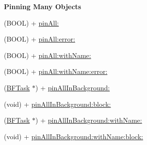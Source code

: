 \begin{Indent}{\bf Pinning Many Objects}\par
{\em 

 

 }\begin{DoxyCompactItemize}
\item 
(B\+O\+O\+L) + \hyperlink{interface_p_f_object_a7b745822b356bdcb5585060852dfb6dd}{pin\+All\+:}
\item 
(B\+O\+O\+L) + \hyperlink{interface_p_f_object_a751ea6dfe718ba34b041d03ea5bfc985}{pin\+All\+:error\+:}
\item 
(B\+O\+O\+L) + \hyperlink{interface_p_f_object_a6d08a07477b09e805ec5aaed3bde5cf6}{pin\+All\+:with\+Name\+:}
\item 
(B\+O\+O\+L) + \hyperlink{interface_p_f_object_a77e27f014698e4155c6111da26730a5d}{pin\+All\+:with\+Name\+:error\+:}
\item 
(\hyperlink{interface_b_f_task}{B\+F\+Task} $\ast$) + \hyperlink{interface_p_f_object_a66c1124af29558923ac3d498239555bc}{pin\+All\+In\+Background\+:}
\item 
(void) + \hyperlink{interface_p_f_object_ac6ad9fc31ab6a60856de8d0abf510a1c}{pin\+All\+In\+Background\+:block\+:}
\item 
(\hyperlink{interface_b_f_task}{B\+F\+Task} $\ast$) + \hyperlink{interface_p_f_object_a2ddadf854045c1eccbde4a80e17f52c0}{pin\+All\+In\+Background\+:with\+Name\+:}
\item 
(void) + \hyperlink{interface_p_f_object_a8c33c98095aa5dbca816b1aca47632dd}{pin\+All\+In\+Background\+:with\+Name\+:block\+:}
\end{DoxyCompactItemize}
\end{Indent}
